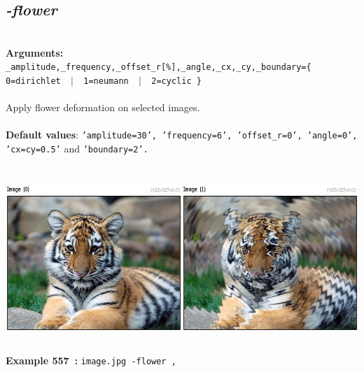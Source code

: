 \documentclass[a4paper,11pt,twoside]{book}
\begin{document}
\subsection{\emph{-flower} }\vspace*{-0.5em}
~\\\textbf{Arguments: } 
{\small \texttt{\_amplitude,\_frequency,\_offset\_r[\%],\_angle,\_cx,\_cy,\_boundary=\{ 0=dirichlet ~$|$~ 1=neumann ~$|$~ 2=cyclic \}}}\\~\\
Apply flower deformation on selected images.
~\\~\\\textbf{Default values}: {\small \texttt{'amplitude=30', 'frequency=6', 'offset\_r=0', 'angle=0', 'cx=cy=0.5'} and \texttt{'boundary=2'.}}
\begin{center}\includegraphics[keepaspectratio=true,height=7cm,width=\textwidth]{img/gmic_def557.jpg}\\
{\footnotesize \textbf{Example 557~:} \texttt{image.jpg -flower ,}}
\end{center}
\end{document}
